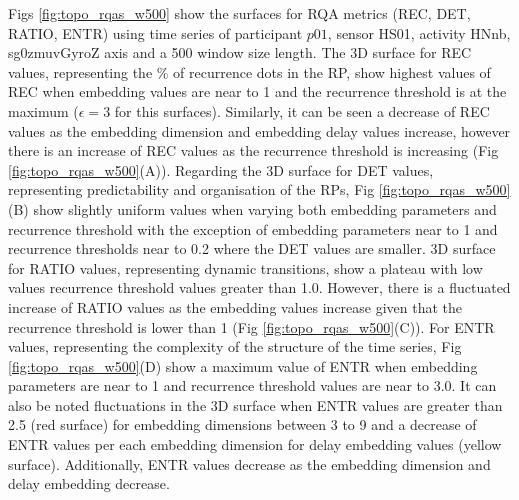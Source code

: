 Figs \ref{fig:topo_rqas_w500} show the surfaces for RQA metrics 
(REC, DET, RATIO, ENTR) using time series of participant $p01$, 
sensor HS01, activity HNnb, sg0zmuvGyroZ axis and a 500 window 
size length.
The 3D surface for REC values, representing the \% of recurrence dots 
in the RP, show highest values of REC when embedding values 
are near to 1 and the recurrence threshold is at the maximum 
($\epsilon = 3$ for this surfaces). Similarly, it can be seen a decrease
of REC values as the embedding dimension and embedding delay values 
increase, however there is an increase of REC values as the recurrence 
threshold is increasing (Fig \ref{fig:topo_rqas_w500}(A)).
Regarding the 3D surface for DET values, representing predictability 
and organisation of the RPs, Fig \ref{fig:topo_rqas_w500}(B) show slightly 
uniform values when varying both embedding parameters and recurrence 
threshold with the exception of embedding parameters near to 1 and 
recurrence thresholds near to 0.2 where the DET values are smaller.
3D surface for RATIO values, representing dynamic transitions, show 
a plateau with low values recurrence threshold values greater than 1.0.
However, there is a fluctuated increase of RATIO values as the embedding 
values increase given that the recurrence threshold is lower 
than 1 (Fig \ref{fig:topo_rqas_w500}(C)).
For ENTR values, representing the complexity of the structure of the 
time series, Fig \ref{fig:topo_rqas_w500}(D) show a maximum value of 
ENTR when embedding parameters are near to 1 and recurrence threshold values
are near to 3.0. It can also be noted fluctuations in the 3D surface 
when ENTR values are greater than 2.5 (red surface) for embedding 
dimensions between 3 to 9 and a decrease of ENTR values per each 
embedding dimension for delay embedding values (yellow surface).
Additionally, ENTR values decrease as the embedding dimension and 
delay embedding decrease.
